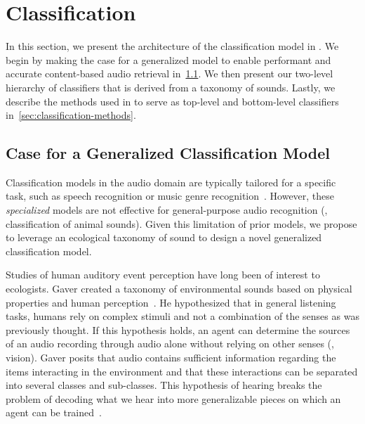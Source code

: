 \section{Classification}

In this section, we present the architecture of the classification model in
\sys. 
%
We begin by making the case for a generalized model to enable
performant and accurate content-based audio retrieval
in~\cref{sec:classification-case}.
%
We then present our two-level hierarchy of classifiers that is derived from a
taxonomy of sounds.
%
Lastly, we describe the methods used in \sys to serve as top-level and
bottom-level classifiers in~\cref{sec:classification-methods}.

\subsection{Case for a Generalized Classification Model}
\label{sec:classification-case}

Classification models in the audio domain are typically tailored for a specific
task, such as speech recognition or music genre recognition~\cite{Campbell1997,
tzanetakis-musical-2002}.
%
However, these \textit{specialized} models are not effective for general-purpose
audio recognition (\eg, classification of animal sounds).
%
Given this limitation of prior models, we propose to leverage an ecological
taxonomy of sound to design a novel generalized classification model.

Studies of human auditory event perception have long been of interest to
ecologists.
%
Gaver created a taxonomy of environmental sounds based on physical properties
and human perception~\cite{Gaver1993}.
%
He hypothesized that in general listening tasks, humans rely on complex stimuli 
and not a combination of the senses as was previously thought.
%
If this hypothesis holds, an agent can determine the sources of an audio
recording through audio alone without relying on other senses (\eg, vision).
%
Gaver posits that audio contains sufficient information regarding the items
interacting in the environment and that these interactions can be separated 
into several classes and sub-classes.
%
This hypothesis of hearing breaks the problem of decoding what we hear into  
more generalizable pieces on which an agent can be trained~\cite{Gaver1993}.
%

